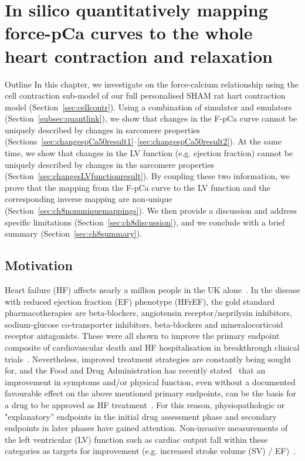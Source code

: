 \chapter{In silico quantitatively mapping force-pCa curves to the whole heart contraction and relaxation}\label{cha:chapter8}
%
%
%
\begin{remark}{Outline}
    In this chapter, we investigate on the force-calcium relationship using the cell contraction sub-model of our full personalised SHAM rat hart contraction model (Section~\ref{sec:cellcontr}). Using a combination of simulator and emulators (Section~\ref{subsec:quantlink}), we show that changes in the F-pCa curve cannot be uniquely described by changes in sarcomere properties (Sections~\ref{sec:changespCa50result1}--\ref{sec:changespCa50result2}). At the same time, we show that changes in the LV function (e.g. ejection fraction) cannot be uniquely described by changes in the sarcomere properties (Section~\ref{sec:changesLVfunctionresult}). By coupling these two information, we prove that the mapping from the F-pCa curve to the LV function and the corresponding inverse mapping are non-unique (Section~\ref{sec:ch8nonuniquemappings}). We then provide a discussion and address specific limitations (Section~\ref{sec:ch8discussion}), and we conclude with a brief summary (Section~\ref{sec:ch8summary}).
\end{remark}


%
%
%
\section{Motivation}\label{sec:ch8motivation}
Heart failure (HF) affects nearly a million people in the UK alone~\cite{Bhf:2021}. In the disease with reduced ejection fraction (EF) phenotype (HFrEF), the gold standard pharmacotherapies are beta-blockers, angiotensin receptor/neprilysin inhibitors, sodium-glucose co-transporter inhibitors, beta-blockers and mineralocorticoid receptor antagonists. These were all shown to improve the primary endpoint composite of cardiovascular death and HF hospitalisation in breakthrough clinical trials~\cite{Debska-Kozlowska:2021}. Nevertheless, improved treatment strategies are constantly being sought for, and the Food and Drug Administration has recently stated~\cite{FDA:2019} that an improvement in symptoms and/or physical function, even without a documented favourable effect on the above mentioned primary endpoints, can be the basis for a drug to be approved as HF treatment~\cite{Fiuzat:2020}. For this reason, physiopathologic or "explanatory'' endpoints in the initial drug assessment phase and secondary endpoints in later phases have gained attention. Non-invasive measurements of the left ventricular (LV) function such as cardiac output fall within these categories as targets for improvement (e.g. increased stroke volume (SV) / EF)~\cite{Zanolla:2003}.

